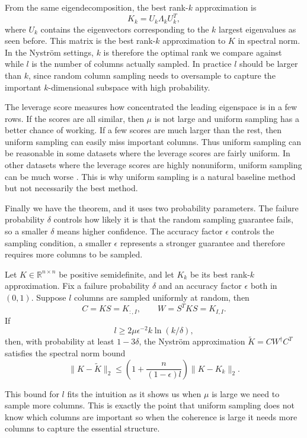 From the same eigendecomposition, the best rank-$k$ approximation is
\[
K_k=U_k\Lambda_k U_k^T,
\]
where $U_k$ contains the eigenvectors corresponding to the $k$ largest eigenvalues as seen before. This matrix is the best rank-$k$ approximation to $K$ in spectral norm. In the Nystr\"om settings, $k$ is therefore the optimal rank we compare against while $l$ is the number of columns actually sampled. In practice $l$ should be larger than $k$, since random column sampling needs to oversample to capture the important $k$-dimensional subspace with high probability.

The leverage score measures how concentrated the leading eigenspace is in a few rows. If the scores are all similar, then $\mu$ is not large and uniform sampling has a better chance of working. If a few scores are much larger than the rest, then uniform sampling can easily miss important columns. Thus uniform sampling can be reasonable in some datasets where the leverage scores are fairly uniform. In other datasets where the leverage scores are highly nonuniform, uniform sampling can be much worse \citep{kumar2012sampling,gittens2016revisiting}. This is why uniform sampling is a natural baseline method but not necessarily the best method.

Finally we have the theorem, and it uses two probability parameters. The failure probability $\delta$ controls how likely it is that the random sampling guarantee fails, so a smaller $\delta$ means higher confidence. The accuracy factor $\epsilon$ controls the sampling condition, a smaller $\epsilon$ represents a stronger guarantee and therefore requires more columns to be sampled.

\begin{theorem}
Let $K\in\mathbb{R}^{n\times n}$ be positive semidefinite, and let $K_k$ be its best rank-$k$ approximation. Fix a failure probability $\delta$ and an accuracy factor $\epsilon$ both in $(0,1)$. Suppose $l$ columns are sampled uniformly at random, then
\[
C=KS=K_{:,I},\qquad W=S^TKS=K_{I,I}.
\]
If
\[
l\geq 2\mu\epsilon^{-2}k\ln(k/\delta),
\]
then, with probability at least $1-3\delta$, the Nystr\"om approximation $\tilde K=CW^\dagger C^T$ satisfies the spectral norm bound
\[
\|K-\tilde K\|_2 \leq \left(1+\frac{n}{(1-\epsilon)l}\right)\|K-K_k\|_2.
\]
\end{theorem}

This bound for $l$ fits the intuition as it shows us when $\mu$ is large we need to sample more columns. This is exactly the point that uniform sampling does not know which columns are important so when the coherence is large it needs more columns to capture the essential structure.

